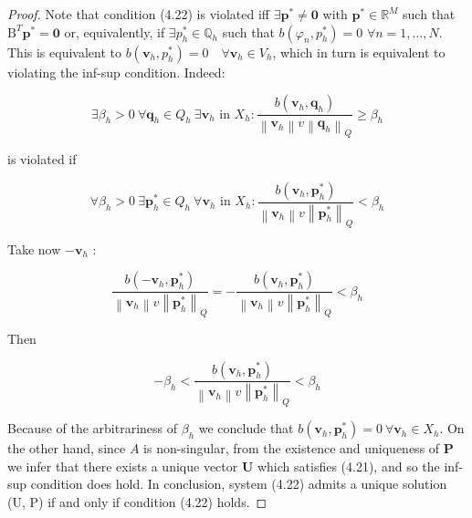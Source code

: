 \documentclass[11pt]{book}
\begin{document}
\begin{proof}
 Note that condition (4.22) is violated iff $\exists \mathbf{p}^{*} \neq \mathbf{0}$ with $\mathbf{p}^{*} \in \mathbb{R}^{M}$ such that $\mathrm{B}^{T} \mathbf{p}^{*}=\mathbf{0}$ or, equivalently, if $\exists p_{h}^{*} \in \mathbb{Q}_{h}$ such that $b\left(\varphi_{n}, p_{h}^{*}\right)=0$ $\forall n=1, \ldots, N$. This is equivalent to $b\left(\mathbf{v}_{h}, p_{h}^{*}\right)=0 \quad \forall \mathbf{v}_{h} \in V_{h}$, which in turn is equivalent to violating the inf-sup condition. Indeed:

$$
\exists \beta_{h}>0 \ \forall \mathbf{q}_{h} \in Q_{h} \ \exists \mathbf{v}_{h} \text { in } X_{h}: \frac{b\left(\mathbf{v}_{h}, \mathbf{q}_{h}\right)}{\left\|\mathbf{v}_{h}\right\| v\left\|\mathbf{q}_{h}\right\|_{Q}} \geq \beta_{h}
$$

is violated if

$$
\forall \beta_{h}>0 \ \exists \mathbf{p}_{h}^{*} \in Q_{h} \ \forall \mathbf{v}_{h} \text { in } X_{h}: \frac{b\left(\mathbf{v}_{h}, \mathbf{p}_{h}^{*}\right)}{\left\|\mathbf{v}_{h}\right\| v\left\|\mathbf{p}_{h}^{*}\right\|_{Q}}<\beta_{h}
$$

Take now $-\mathbf{v}_{h}$ :

$$
\frac{b\left(-\mathbf{v}_{h}, \mathbf{p}_{h}^{*}\right)}{\left\|\mathbf{v}_{h}\right\| v\left\|\mathbf{p}_{h}^{*}\right\|_{Q}}=-\frac{b\left(\mathbf{v}_{h}, \mathbf{p}_{h}^{*}\right)}{\left\|\mathbf{v}_{h}\right\| v\left\|\mathbf{p}_{h}^{*}\right\|_{Q}}<\beta_{h}
$$

Then

$$
-\beta_{h}<\frac{b\left(\mathbf{v}_{h}, \mathbf{p}_{h}^{*}\right)}{\left\|\mathbf{v}_{h}\right\| v\left\|\mathbf{p}_{h}^{*}\right\|_{Q}}<\beta_{h}
$$

Because of the arbitrariness of $\beta_{h}$ we conclude that $b\left(\mathbf{v}_{h}, \mathbf{p}_{h}^{*}\right)=0 
\ \forall \mathbf{v}_{h} \in X_{h}$.
On the other hand, since $A$ is non-singular, from the existence and uniqueness of $\mathbf{P}$ we infer that there exists a unique vector $\mathbf{U}$ which satisfies (4.21), and so the inf-sup condition does hold.
In conclusion, system (4.22) admits a unique solution (U, P) if and only if condition (4.22) holds.

\end{proof}
\end{document}
